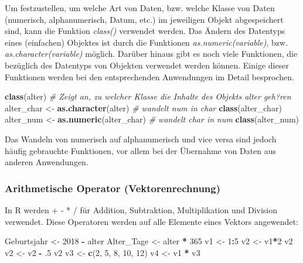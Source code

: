 \documentclass[]{article}
\newenvironment{Shaded}{\begin{snugshade}}{\end{snugshade}}
\newcommand{\KeywordTok}[1]{\textcolor[rgb]{0.13,0.29,0.53}{\textbf{#1}}}
\newcommand{\DecValTok}[1]{\textcolor[rgb]{0.00,0.00,0.81}{#1}}
\newcommand{\StringTok}[1]{\textcolor[rgb]{0.31,0.60,0.02}{#1}}
\newcommand{\CommentTok}[1]{\textcolor[rgb]{0.56,0.35,0.01}{\textit{#1}}}
\newcommand{\OperatorTok}[1]{\textcolor[rgb]{0.81,0.36,0.00}{\textbf{#1}}}
\newcommand{\NormalTok}[1]{#1}
\begin{document}
Um festzustellen, um welche Art von Daten, bzw. welche Klasse von Daten
(numerisch, alphanumerisch, Datum, etc.) im jeweiligen Objekt
abgespeichert sind, kann die Funktion \emph{class()} verwendet werden.
Das Ändern des Datentyps eines (einfachen) Objektes ist durch die
Funktionen \emph{as.numeric(variable)}, bzw.
\emph{as.character(variable)} möglich. Darüber hinaus gibt es noch viele
Funktionen, die bezüglich des Datentyps von Objekten verwendet werden
können. Einige dieser Funktionen werden bei den entsprechenden
Anwendungen im Detail besprochen.

\begin{Shaded}
\begin{Highlighting}[]
    \KeywordTok{class}\NormalTok{(alter) }\CommentTok{# Zeigt an, zu welcher Klasse die Inhalte des Objekts alter geh?ren}
\NormalTok{    alter_char <-}\StringTok{ }\KeywordTok{as.character}\NormalTok{(alter) }\CommentTok{# wandelt num in char}
    \KeywordTok{class}\NormalTok{(alter_char)}
\NormalTok{    alter_num  <-}\StringTok{ }\KeywordTok{as.numeric}\NormalTok{(alter_char) }\CommentTok{# wandelt char in num}
    \KeywordTok{class}\NormalTok{(alter_num)}
\end{Highlighting}
\end{Shaded}

Das Wandeln von numerisch auf alphanumerisch und vice versa sind jedoch
häufig gebrauchte Funktionen, vor allem bei der Übernahme von Daten aus
anderen Anwendungen.

\subsubsection*{Arithmetische Operator
(Vektorenrechnung)}\label{arithmetische-operator-vektorenrechnung}

In R werden + - * / für Addition, Subtraktion, Multiplikation und
Division verwendet. Diese Operatoren werden auf alle Elemente eines
Vektors angewendet:

\begin{Shaded}
\begin{Highlighting}[]
\NormalTok{    Geburtsjahr <-}\StringTok{ }\DecValTok{2018} \OperatorTok{-}\StringTok{ }\NormalTok{alter}
\NormalTok{    Alter_Tage  <-}\StringTok{ }\NormalTok{alter }\OperatorTok{*}\StringTok{ }\DecValTok{365}
\NormalTok{    v1 <-}\StringTok{ }\DecValTok{1}\OperatorTok{:}\DecValTok{5}
\NormalTok{    v2 <-}\StringTok{ }\NormalTok{v1}\OperatorTok{*}\DecValTok{2}
\NormalTok{    v2}
\NormalTok{    v2 <-}\StringTok{ }\NormalTok{v2 }\OperatorTok{-}\StringTok{ }\NormalTok{.}\DecValTok{5}
\NormalTok{    v2}
\NormalTok{    v3 <-}\StringTok{ }\KeywordTok{c}\NormalTok{(}\DecValTok{2}\NormalTok{, }\DecValTok{5}\NormalTok{, }\DecValTok{8}\NormalTok{, }\DecValTok{10}\NormalTok{, }\DecValTok{12}\NormalTok{)}
\NormalTok{    v4 <-}\StringTok{ }\NormalTok{v1 }\OperatorTok{*}\StringTok{ }\NormalTok{v3}
\end{Highlighting}
\end{Shaded}
\end{document}
